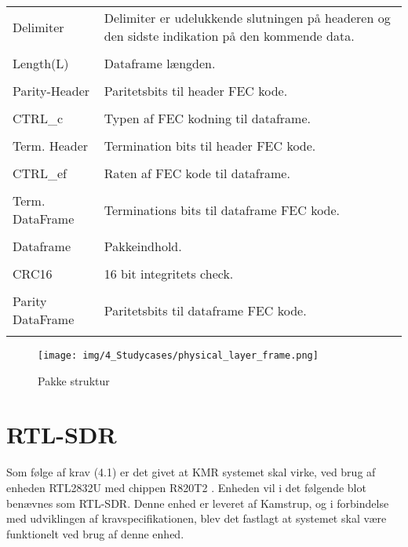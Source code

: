 \begin{appendices}
\begin{tabular}{ p{3cm} | p{9cm} }
	Delimiter & Delimiter er udelukkende slutningen på headeren og den sidste indikation på den kommende data. \\ \\
	
	Length(L) & Dataframe længden. \\ \\
	
	Parity-Header &  Paritetsbits til header FEC kode.\\ \\
	
	CTRL\_c &  Typen af FEC kodning til dataframe. \\ \\
	
	Term. Header & Termination bits til header FEC kode. \\ \\
	
	CTRL\_ef &  Raten af FEC kode til dataframe. \\ \\
	
	Term. DataFrame &  Terminations bits til dataframe FEC kode.\\ \\
	
	Dataframe &  Pakkeindhold. \\ \\
	
	CRC16 &  16 bit integritets check. \\ \\
	
	Parity DataFrame &  Paritetsbits til dataframe FEC kode. \\ \\
\end{tabular}

\begin{figure}[H]
	\centering{}
	\texttt{[image: img/4\_Studycases/physical\_layer\_frame.png]}
	\caption{Pakke struktur}
	\label{fig:pakke_struktur}
\end{figure} 

\pagebreak
\section{RTL-SDR} \label{appendix::studycase::rtlsdr}
Som følge af krav (4.1) er det givet at KMR systemet skal virke, ved brug af enheden RTL2832U med chippen R820T2 \cite{RTLSDR}. Enheden vil i det følgende blot benævnes som RTL-SDR. Denne enhed er leveret af Kamstrup, og i forbindelse med udviklingen af kravspecifikationen, blev det fastlagt at systemet skal være funktionelt ved brug af denne enhed. 


\end{appendices}
